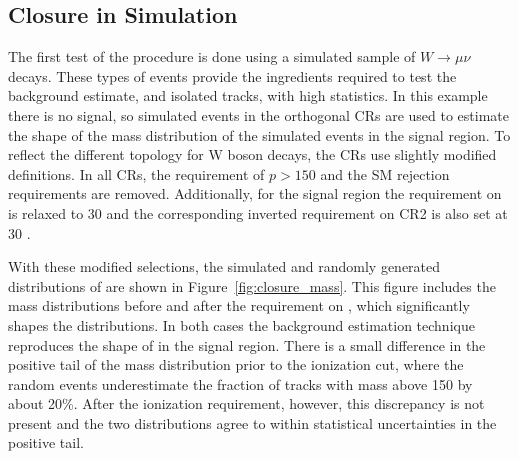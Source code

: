 \subsection{Closure in Simulation}
The first test of the procedure is done using a simulated sample of $W\rightarrow\mu\nu$ decays.
These types of events provide the ingredients required to test the background estimate, \met and isolated tracks, with high statistics.
In this example there is no signal, so simulated events in the orthogonal \acp{CR} are used to estimate the shape of the mass distribution of the simulated events in the signal region.
To reflect the different topology for W boson decays, the \acp{CR} use slightly modified definitions.
In all \acp{CR}, the requirement of $p > 150$ \GeV and the \ac{SM} rejection requirements are removed.
Additionally, for the signal region the requirement on \met is relaxed to 30 \GeV and the corresponding inverted requirement on CR2 is also set at 30 \GeV.

With these modified selections, the simulated and randomly generated distributions of \mdedx are shown in Figure~\ref{fig:closure_mass}. 
This figure includes the mass distributions before and after the requirement on \dedx, which significantly shapes the distributions.
In both cases the background estimation technique reproduces the shape of \mdedx in the signal region.
There is a small difference in the positive tail of the mass distribution prior to the ionization cut, where the random events underestimate the fraction of tracks with mass above 150 \GeV by about 20\%.
After the ionization requirement, however, this discrepancy is not present and the two distributions agree to within statistical uncertainties in the positive tail.

